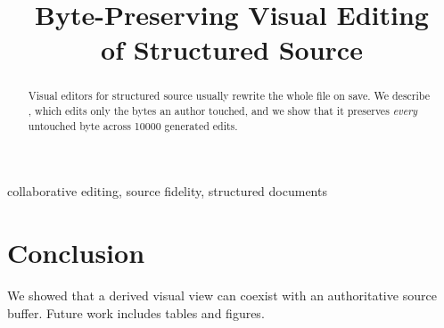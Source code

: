 \documentclass[conference]{IEEEtran}
\begin{document}
\title{Byte-Preserving Visual Editing\\of Structured Source}

\author{
\and
{}
}

\maketitle

\begin{abstract}
Visual editors for structured source usually rewrite the whole file on save.
We describe \sys, which edits only the bytes an author touched, and we show that
it preserves \emph{every} untouched byte across \num{10000} generated edits.
\end{abstract}

\begin{IEEEkeywords}
collaborative editing, source fidelity, structured documents
\end{IEEEkeywords}





\section{Conclusion}
We showed that a derived visual view can coexist with an authoritative source
buffer. Future work includes tables and figures.



\end{document}
